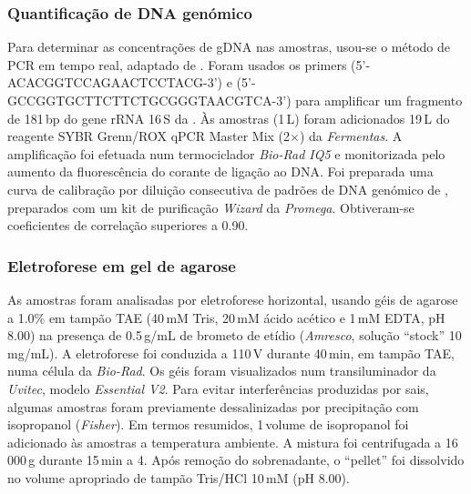 \subsubsection{Quantificação de DNA genómico}
%
Para determinar as concentrações de gDNA nas amostras, usou-se o método de PCR em tempo real, adaptado de \cite{martinspcr}.
%
Foram usados os primers (5'-ACACGGTCCAGAACTCCTACG-3') e (5'-GCCGGTGC\-TTCTTCTGCGGGTAACGTCA-3') para amplificar um fragmento de 181\,bp do gene rRNA 16\,S da \ecoli.
%
%
Às amostras (1\,\micro L) foram adicionados 19\,\micro L do reagente SYBR Grenn/ROX qPCR Master Mix (2$\times$) da \emph{Fermentas}.
%
%
%
A amplificação foi efetuada num termociclador \emph{Bio-Rad IQ5} e monitorizada pelo aumento da fluorescência do corante de ligação ao DNA. Foi preparada uma curva de calibração por diluição consecutiva de padrões de DNA genómico de \ecolidh, preparados com um kit de purificação \emph{Wizard} da \emph{Promega}. Obtiveram-se coeficientes de correlação superiores a 0.90.

\subsubsection{Eletroforese em gel de agarose}
%
%
As amostras foram analisadas por eletroforese horizontal, usando géis de agarose a 1.0\% em tampão TAE (40\,mM Tris, 20\,mM ácido acético e 1\,mM EDTA, pH 8.00) na presença de 0.5\,\micro g/mL de brometo de etídio (\emph{Amresco}, solução ``stock'' 10\,mg/mL). A eletroforese foi conduzida a 110\,V durante 40\,min, em tampão TAE, numa célula da \emph{Bio-Rad}. Os géis foram visualizados num transiluminador da \emph{Uvitec}, modelo \emph{Essential V2}.
%
%
Para evitar interferências produzidas por sais, algumas amostras foram previamente dessalinizadas por precipitação com isopropanol (\emph{Fisher}).
%
Em termos resumidos, 1\,volume de isopropanol foi adicionado às amostras a temperatura ambiente. A mistura foi centrifugada a 16\,000\,g durante 15\,min a 4\degreecelsius. Após remoção do sobrenadante, o ``pellet'' foi dissolvido no volume apropriado de tampão Tris/HCl 10\,mM (pH 8.00).


